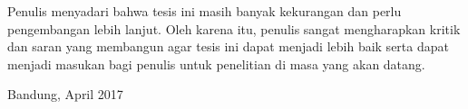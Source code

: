 \noindent Penulis menyadari bahwa tesis ini masih banyak kekurangan dan perlu pengembangan lebih lanjut. Oleh karena itu, penulis sangat mengharapkan kritik dan saran yang membangun agar tesis ini dapat menjadi lebih baik serta dapat menjadi masukan bagi penulis untuk penelitian di masa yang akan datang.

\vspace*{0.1cm}
\begin{flushright}
Bandung, April 2017\\[0.1cm]
\vspace*{1cm}
\penulis

\end{flushright}